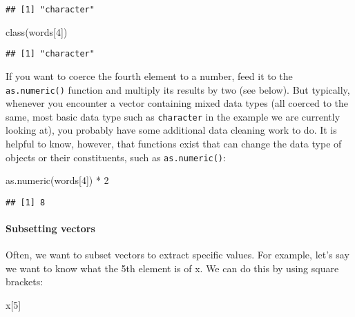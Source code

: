 \documentclass[
]{article}
\newenvironment{Shaded}{\begin{snugshade}}{\end{snugshade}}
\newcommand{\DecValTok}[1]{\textcolor[rgb]{0.00,0.00,0.81}{#1}}
\newcommand{\FunctionTok}[1]{\textcolor[rgb]{0.00,0.00,0.00}{#1}}
\newcommand{\NormalTok}[1]{#1}
\newcommand{\SpecialCharTok}[1]{\textcolor[rgb]{0.00,0.00,0.00}{#1}}
\begin{document}
\begin{verbatim}
## [1] "character"
\end{verbatim}

\begin{Shaded}
\begin{Highlighting}[]
\FunctionTok{class}\NormalTok{(words[}\DecValTok{4}\NormalTok{])}
\end{Highlighting}
\end{Shaded}

\begin{verbatim}
## [1] "character"
\end{verbatim}

If you want to coerce the fourth element to a number, feed it to the
\texttt{as.numeric()} function and multiply its results by two (see
below). But typically, whenever you encounter a vector containing mixed
data types (all coerced to the same, most basic data type such as
\texttt{character} in the example we are currently looking at), you
probably have some additional data cleaning work to do. It is helpful to
know, however, that functions exist that can change the data type of
objects or their constituents, such as \texttt{as.numeric()}:

\begin{Shaded}
\begin{Highlighting}[]
\FunctionTok{as.numeric}\NormalTok{(words[}\DecValTok{4}\NormalTok{]) }\SpecialCharTok{*} \DecValTok{2}
\end{Highlighting}
\end{Shaded}

\begin{verbatim}
## [1] 8
\end{verbatim}

\hypertarget{subsetting-vectors}{%
\paragraph{Subsetting vectors}\label{subsetting-vectors}}

Often, we want to subset vectors to extract specific values. For
example, let's say we want to know what the 5th element is of x. We can
do this by using square brackets:

\begin{Shaded}
\begin{Highlighting}[]
\NormalTok{x[}\DecValTok{5}\NormalTok{]}
\end{Highlighting}
\end{Shaded}
\end{document}
